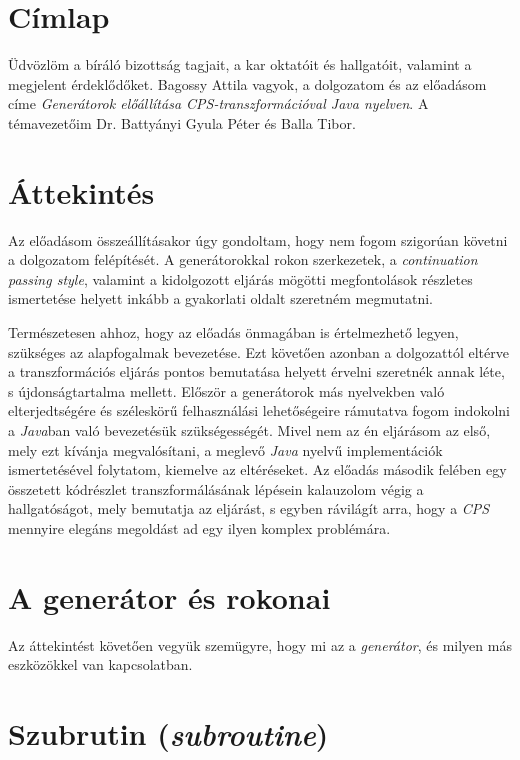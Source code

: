 \documentclass[12pt, a4paper]{article}
\begin{document}
\section{Címlap}
Üdvözlöm a bíráló bizottság tagjait, a kar oktatóit és hallgatóit, valamint a megjelent érdeklődőket. Bagossy Attila vagyok, a dolgozatom és az előadásom címe \textit{Generátorok előállítása CPS-transzformációval Java nyelven}. A témavezetőim Dr. Battyányi Gyula Péter és Balla Tibor.

\section{Áttekintés}
Az előadásom összeállításakor úgy gondoltam, hogy nem fogom szigorúan követni a dolgozatom felépítését. A generátorokkal rokon szerkezetek, a \textit{continuation passing style}, valamint a kidolgozott eljárás mögötti megfontolások részletes ismertetése helyett inkább a gyakorlati oldalt szeretném megmutatni. 

Természetesen ahhoz, hogy az előadás önmagában is értelmezhető legyen, szükséges az alapfogalmak bevezetése. Ezt követően azonban a dolgozattól eltérve a transzformációs eljárás pontos bemutatása helyett érvelni szeretnék annak léte, s újdonságtartalma mellett. Először a generátorok más nyelvekben való elterjedtségére és széleskörű felhasználási lehetőségeire rámutatva fogom indokolni a \textit{Java}ban való bevezetésük szükségességét. Mivel nem az én eljárásom az első, mely ezt kívánja megvalósítani, a meglevő \textit{Java} nyelvű implementációk ismertetésével folytatom, kiemelve az eltéréseket. Az előadás második felében egy összetett kódrészlet transzformálásának lépésein kalauzolom végig a hallgatóságot, mely bemutatja az eljárást, s egyben rávilágít arra, hogy a \textit{CPS} mennyire elegáns megoldást ad egy ilyen komplex problémára.

\section{A generátor és rokonai}

Az áttekintést követően vegyük szemügyre, hogy mi az a \textit{generátor}, és milyen más eszközökkel van kapcsolatban.

\section{Szubrutin (\textit{subroutine})}
\end{document}
